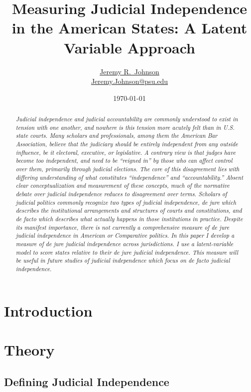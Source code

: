 \documentclass[12pt]{article}
\title{Measuring Judicial Independence in the American States: A Latent Variable Approach}
\author{\href{http://www.jeremyrjohnson.org/}{Jeremy R.\ Johnson}\\ \href{mailto:Jeremy.Johnson@psu.edu}{Jeremy.Johnson@psu.edu}}
\affil{Pennsylvania State University}
\date{\today}
\begin{document}
\maketitle
\thispagestyle{empty}
	
\begin{abstract}
\textit{Judicial independence and judicial accountability are commonly understood to exist in tension with one another, and nowhere is this tension more acutely felt than in U.S. state courts. Many scholars and professionals, among them the American Bar Association, believe that the judiciary should be entirely independent from any outside influence, be it electoral, executive, or legislative. A contrary view is that judges have become too independent, and need to be “reigned in” by those who can affect control over them, primarily through judicial elections. The core of this disagreement lies with differing understanding of what constitutes “independence” and “accountability.” Absent clear conceptualization and measurement of these concepts, much of the normative debate over judicial independence reduces to disagreement over terms. Scholars of judicial politics commonly recognize two types of judicial independence, de jure which describes the institutional arrangements and structures of courts and constitutions, and de facto which describes what actually happens in those institutions in practice.  Despite its manifest importance, there is not currently a comprehensive measure of de jure judicial independence in American or Comparative politics. In this paper I develop a measure of de jure judicial independence across jurisdictions. I use a latent-variable model to score states relative to their de jure judicial independence. This measure will be useful in future studies of judicial independence which focus on de facto judicial independence.}
\end{abstract}
	
	
\pagebreak\doublespacing
\setcounter{page}{1}

\section*{Introduction}

\section*{Theory}
\subsection*{Defining Judicial Independence}%
\end{document}
